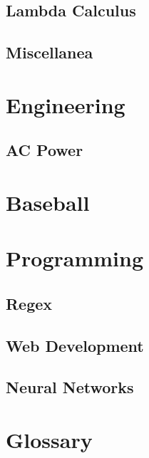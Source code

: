 \documentclass[10pt,letterpaper]{scrartcl}
\begin{document}
\subsection{Lambda Calculus}
\subsection[Misc.]{Miscellanea}

\newpage\section{Engineering}
\subsection{AC Power}

\newpage\section{Baseball}

\newpage\section{Programming}
\subsection{Regex}
\subsection{Web Development}
\subsection{Neural Networks}

\newpage\section{Glossary}
\end{document}
